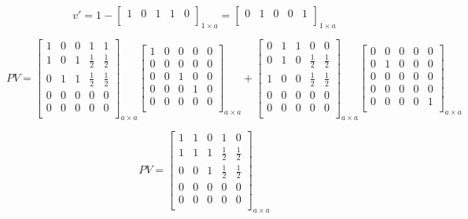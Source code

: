 $$v'=1-\left[
\begin{array}{ccccc}
1 & 0 & 1 & 1 & 0 \\
\end{array}
\right]_{1 \times a}
=
\left[
\begin{array}{ccccc}
0 & 1 & 0 & 0 & 1 \\
\end{array}
\right]_{1 \times a}
$$

$$PV=
\left[
\begin{array}{ccccc}
1 & 0 & 0 & 1 & 1 \\
1 & 0 & 1 & \frac{1}{2} & \frac{1}{2} \\
0 & 1 & 1 & \frac{1}{2} & \frac{1}{2} \\
0 & 0 & 0 & 0 & 0 \\
0 & 0 & 0 & 0 & 0 \\
\end{array}
\right]_{a \times a}
\left[
\begin{array}{ccccc}
1 & 0 & 0 & 0 & 0 \\
0 & 0 & 0 & 0 & 0 \\
0 & 0 & 1 & 0 & 0 \\
0 & 0 & 0 & 1 & 0 \\
0 & 0 & 0 & 0 & 0 \\
\end{array}
\right]_{a \times a}
+
\left[
\begin{array}{ccccc}
0 & 1 & 1 & 0 & 0 \\
0 & 1 & 0 & \frac{1}{2} & \frac{1}{2} \\
1 & 0 & 0 & \frac{1}{2} & \frac{1}{2} \\
0 & 0 & 0 & 0 & 0 \\
0 & 0 & 0 & 0 & 0 \\
\end{array}
\right]_{a \times a}
\left[
\begin{array}{ccccc}
0 & 0 & 0 & 0 & 0 \\
0 & 1 & 0 & 0 & 0 \\
0 & 0 & 0 & 0 & 0 \\
0 & 0 & 0 & 0 & 0 \\
0 & 0 & 0 & 0 & 1 \\
\end{array}
\right]_{a \times a}
$$

$$PV=\left[
\begin{array}{ccccc}
1 & 1 & 0 & 1 & 0 \\
1 & 1 & 1 & \frac{1}{2} & \frac{1}{2} \\
0 & 0 & 1 & \frac{1}{2} & \frac{1}{2} \\
0 & 0 & 0 & 0 & 0 \\
0 & 0 & 0 & 0 & 0 \\
\end{array}
\right]_{a \times a}$$

